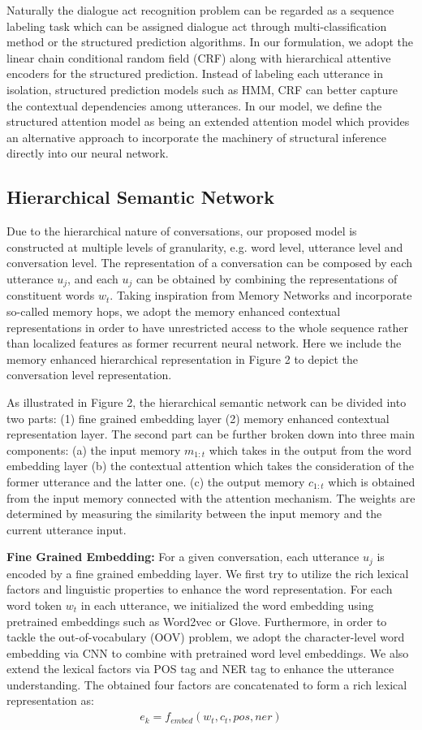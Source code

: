 \documentclass[sigconf]{acmart}
\begin{document}
Naturally the dialogue act recognition problem can be regarded as a sequence labeling task which can be assigned dialogue act through multi-classification method or the structured prediction algorithms. In our formulation, we adopt the linear chain conditional random field (CRF) along with hierarchical attentive encoders for the structured prediction. Instead of labeling each utterance in isolation, structured prediction models such as HMM, CRF can better capture the contextual dependencies among utterances. In our model, we define the structured attention model as being an extended attention model which provides an alternative approach to incorporate the machinery of structural inference directly into our neural network. 

\subsection{Hierarchical Semantic Network}
Due to the hierarchical nature of conversations, our proposed model is constructed at multiple levels of granularity, e.g. word level, utterance level and conversation level. The representation of a conversation can be composed by each utterance $u_j$, and each $u_j$ can be obtained by combining the representations of constituent words $w_t$. Taking inspiration from Memory Networks and incorporate so-called memory hops, we adopt the memory enhanced contextual representations in order to have unrestricted access to the whole sequence rather than localized features as former recurrent neural network. Here we include the memory enhanced hierarchical representation in Figure 2 to depict the conversation level representation.

As illustrated in Figure 2, the hierarchical semantic network can be divided into two parts: (1) fine grained embedding layer (2) memory enhanced contextual representation layer. The second part can be further broken down into three main components: (a) the input memory $m_{1:t}$ which takes in the output from the  word embedding layer (b) the contextual attention which takes the consideration of the former utterance and the latter one. (c) the output memory $c_{1:t}$ which is obtained from the input memory connected with the attention mechanism. The weights are determined by measuring the similarity between the input memory and the current utterance input. 

\noindent \textbf{Fine Grained Embedding: } For a given conversation, each utterance $u_j$ is encoded by a fine grained embedding layer. We first try to utilize the rich lexical factors and linguistic properties to enhance the word representation. For each word token $w_t$ in each utterance, we initialized the word embedding using pretrained embeddings such as Word2vec or Glove. Furthermore, in order to tackle the out-of-vocabulary (OOV) problem, we adopt the character-level word embedding via CNN to combine with pretrained word level embeddings. We also extend the lexical factors via POS tag and NER tag to enhance the utterance understanding. The obtained four factors are concatenated to form a rich lexical representation as:
\begin{align*}
      e_k=f_{embed}(w_t,c_t,pos,ner) \tag{1}
\end{align*}
\end{document}
